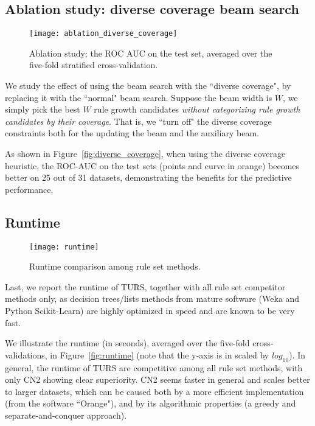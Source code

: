 \subsection{Ablation study: diverse coverage beam search}
\begin{figure}[ht] \label{fig:diverse_coverage}
	\texttt{[image: ablation\_diverse\_coverage]}
	\caption{Ablation study: the ROC AUC on the test set, averaged over the five-fold stratified cross-validation.}
	\label{fig:heatmap_modelcomplexity}
\end{figure}
We study the effect of using the beam search with the ``diverse coverage", by replacing it with the ``normal" beam search. Suppose the beam width is $W$, we simply pick the best $W$ rule growth candidates \emph{without categorizing rule growth candidates by their coverage}. That is, we ``turn off" the diverse coverage constraints both for the updating the beam and the auxiliary beam. 

As shown in Figure~\ref{fig:diverse_coverage}, when using the diverse coverage heuristic, the ROC-AUC on the test sets (points and curve in orange) becomes better on 25 out of 31 datasets, demonstrating the benefits for the predictive performance. 

\subsection{Runtime}
\begin{figure}[ht] \label{fig:runtime}
	\texttt{[image: runtime]}
	\caption{Runtime comparison among rule set methods.}	 
	\label{fig:heatmap_modelcomplexity}
\end{figure}
Last, we report the runtime of TURS, together with all rule set competitor methods only, as decision trees/lists methods from mature software (Weka and Python Scikit-Learn) are highly optimized in speed and are known to be very fast. 

We illustrate the runtime (in seconds), averaged over the five-fold cross-validations, in Figure~\ref{fig:runtime} (note that the y-axis is in scaled by $log_{10}$). In general, the runtime of TURS are competitive among all rule set methods, with only CN2 showing clear superiority. CN2 seems faster in general and scales better to larger datasets, which can be caused both by a more efficient implementation (from the software ``Orange"), and by its algorithmic properties (a greedy and separate-and-conquer approach). 














